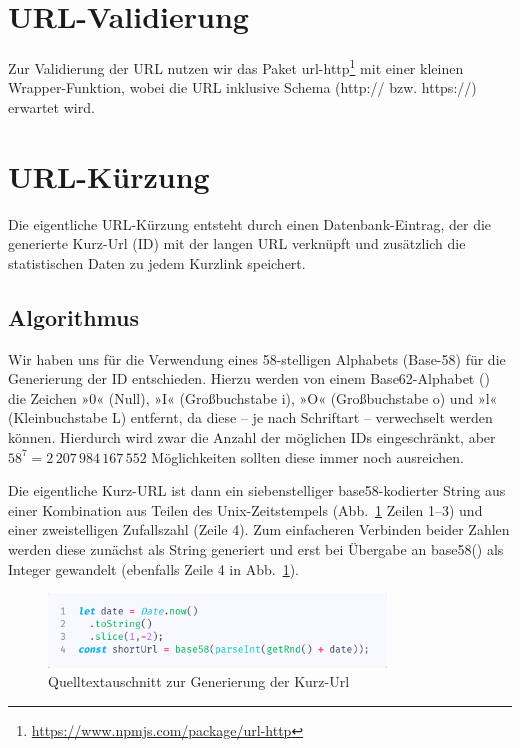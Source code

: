 \documentclass[a4paper,11pt,DIV=12,overfullrule=on]{scrreprt}
\begin{document}
\section{URL-Validierung}
Zur Validierung der URL nutzen wir das Paket {\ttfamily url-http}\footnote{\href{https://www.npmjs.com/package/url-http}{https://www.npmjs.com/package/url-http}} mit einer kleinen Wrapper-Funktion, wobei die URL inklusive Schema ({\ttfamily http://} bzw. {\ttfamily https://}) erwartet wird.
\section{URL-Kürzung}
Die eigentliche URL-Kürzung entsteht durch einen Datenbank-Eintrag, der die generierte Kurz-Url (ID) mit der langen URL verknüpft und zusätzlich die statistischen Daten zu jedem Kurzlink speichert.
\subsection{Algorithmus}
Wir haben uns für die Verwendung eines 58-stelligen Alphabets (Base-58) für die Generierung der ID entschieden. Hierzu werden von einem Base62-Alphabet ({\ttfamily[0-9A-Za-z]}) die Zeichen »0« (Null), »I« (Großbuchstabe i), »O« (Großbuchstabe o) und »l« (Kleinbuchstabe L) entfernt, da diese – je nach Schriftart – verwechselt werden können. Hierdurch wird zwar die Anzahl der möglichen IDs eingeschränkt, aber $58^7 =  2\,207\,984\,167\,552$ Möglichkeiten sollten diese immer noch ausreichen.

Die eigentliche Kurz-URL ist dann ein siebenstelliger base58-kodierter String aus einer Kombination aus Teilen des Unix-Zeitstempels (Abb.~\ref{fig:261shorturl} Zeilen 1–3) und einer zweistelligen Zufallszahl (Zeile 4). Zum einfacheren Verbinden beider Zahlen werden diese zunächst als String generiert und erst bei Übergabe an {\ttfamily base58()} als Integer gewandelt (ebenfalls Zeile 4 in Abb.~\ref{fig:261shorturl}).
\begin{figure}%
    \begin{small}%
        \begin{center}%
            \includegraphics[width=0.8\textwidth]{2_6_1_shortUrl.png}%
        \end{center}%
        \caption{Quelltextauschnitt zur Generierung der Kurz-Url}%
        \label{fig:261shorturl}%
    \end{small}%
\end{figure}%
\end{document}
